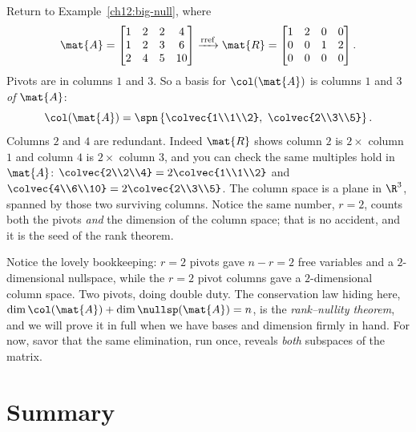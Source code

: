 \begin{example}\label{ch12:colspace-basis}
Return to Example~\ref{ch12:big-null}, where
\[
  \mat{A} = \begin{bmatrix} 1 & 2 & 2 & 4 \\ 1 & 2 & 3 & 6 \\ 2 & 4 & 5 & 10
  \end{bmatrix}
  \xrightarrow{\text{rref}}
  \mat{R} = \begin{bmatrix} 1 & 2 & 0 & 0 \\ 0 & 0 & 1 & 2 \\ 0 & 0 & 0 & 0
  \end{bmatrix}.
\]
Pivots are in columns $1$ and $3$. So a basis for $\col(\mat{A})$ is columns $1$
and $3$ \emph{of $\mat{A}$}:
\[
  \col(\mat{A}) = \spn\left\{\colvec{1\\1\\2},\ \colvec{2\\3\\5}\right\}.
\]
Columns $2$ and $4$ are redundant. Indeed $\mat{R}$ shows column $2$ is $2\times$
column $1$ and column $4$ is $2\times$ column $3$, and you can check the same
multiples hold in $\mat{A}$: $\colvec{2\\2\\4}=2\colvec{1\\1\\2}$ and
$\colvec{4\\6\\10}=2\colvec{2\\3\\5}$. The column space is a plane in $\R^3$,
spanned by those two surviving columns. Notice the same number, $r=2$, counts
both the pivots \emph{and} the dimension of the column space; that is no accident,
and it is the seed of the rank theorem.
\end{example}

Notice the lovely bookkeeping: $r = 2$ pivots gave $n - r = 2$ free variables and
a $2$-dimensional nullspace, while the $r = 2$ pivot columns gave a
$2$-dimensional column space. Two pivots, doing double duty. The conservation law
hiding here, $\dim\col(\mat{A}) + \dim\nullsp(\mat{A}) = n$, is the
\emph{rank--nullity theorem}, and we will prove it in full when we have bases and
dimension firmly in hand. For now, savor that the same elimination, run once,
reveals \emph{both} subspaces of the matrix.

\section{Summary}

